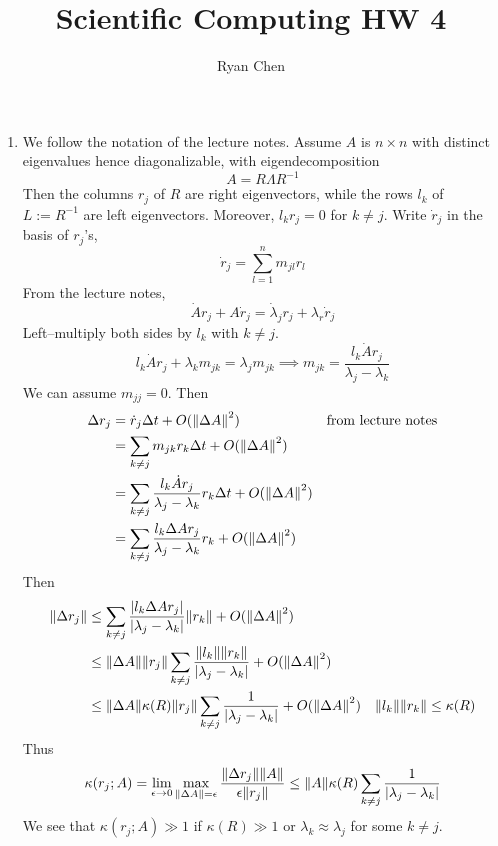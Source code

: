 \documentclass{article}
\title{Scientific Computing HW 4}
\author{Ryan Chen}
\newcommand{\e}{\epsilon}
\renewcommand{\l}{\lambda}
\newcommand{\inv}{^{-1}}
\newcommand{\imp}{\implies}
\begin{document}
	
\maketitle



\begin{enumerate}
	
	
	
	\item We follow the notation of the lecture notes. Assume $A$ is $n\times n$ with distinct eigenvalues hence diagonalizable, with eigendecomposition
	\[A = R\Lambda R\inv\]
	Then the columns $r_j$ of $R$ are right eigenvectors, while the rows $l_k$ of $L:=R\inv$ are left eigenvectors. Moreover, $l_kr_j=0$ for $k\ne j$. Write $\dot r_j$ in the basis of $r_j$'s,
	\[\dot r_j = \sum_{l=1}^n m_{jl}r_l\]
	From the lecture notes,
	\[\dot Ar_j + A\dot r_j = \dot\l_jr_j + \l_r\dot r_j\]
	Left--multiply both sides by $l_k$ with $k\ne j$.
	\[l_k\dot Ar_j + \l_km_{jk} = \l_jm_{jk}
	\imp m_{jk} = \frac{l_k\dot Ar_j}{\l_j-\l_k}\]
	We can assume $m_{jj}=0$. Then
	\begin{align*}
		\Delta r_j &= \dot r_j\Delta t + O(\norm{\Delta A}^2) & \text{from lecture notes} \\
		&= \sum_{k\ne j} m_{jk}r_k\Delta t + O(\norm{\Delta A}^2) \\
		&= \sum_{k\ne j} \frac{l_k\dot Ar_j}{\l_j-\l_k}r_k\Delta t + O(\norm{\Delta A}^2) \\
		&= \sum_{k\ne j} \frac{l_k\Delta Ar_j}{\l_j-\l_k}r_k + O(\norm{\Delta A}^2) \\
	\end{align*}
	Then
	\begin{align*}
		\norm{\Delta r_j} &\le \sum_{k\ne j} \frac{\abs{l_k\Delta Ar_j}}{\abs{\l_j-\l_k}}\norm{r_k} + O(\norm{\Delta A}^2) \\
		&\le \norm{\Delta A}\norm{r_j}\sum_{k\ne j}\frac{\norm{l_k}\norm{r_k}}{|\l_j-\l_k|} + O(\norm{\Delta A}^2) \\
		&\le \norm{\Delta A}\kappa(R)\norm{r_j}\sum_{k\ne j}\frac{1}{|\l_j-\l_k|} + O(\norm{\Delta A}^2) & \norm{l_k}\norm{r_k} \le \kappa(R) \\
	\end{align*}
	Thus
	\[\kappa(r_j;A) = \lim_{\e\to0}\max_{\norm{\Delta A}=\e}\frac{\norm{\Delta r_j}\norm{A}}{\e\norm{r_j}}
	\le \norm{A}\kappa(R)\sum_{k\ne j}\frac{1}{|\l_j-\l_k|}\]
	We see that $\kappa(r_j;A)\gg1$ if $\kappa(R)\gg1$ or $\l_k\approx\l_j$ for some $k\ne j$.
	
	
	

\end{enumerate}
\end{document}
